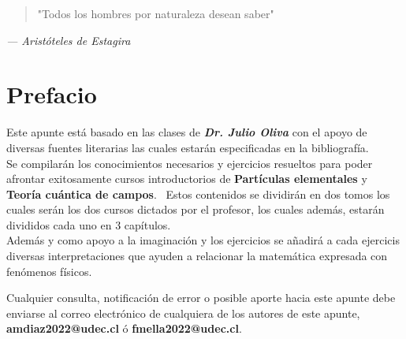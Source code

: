 \documentclass[../main.tex]{subfiles}
\begin{document}
\thispagestyle{empty}

\vspace*{\fill}  %
\begin{center}
    \begin{quote}
        "Todos los hombres por naturaleza desean saber"
    \end{quote}
    \vspace{1cm}  %
    \textit{— Aristóteles de Estagira}  %
\end{center}

\vspace*{\fill}  %
\newpage

\chapter*{Prefacio}

Este apunte está basado en las clases de \textbf{\emph{Dr. Julio Oliva}} con el apoyo de diversas fuentes literarias las cuales estarán especificadas en la bibliografía. \\
Se compilarán los conocimientos necesarios y ejercicios resueltos para poder afrontar exitosamente cursos introductorios de \textbf{Partículas elementales} y \textbf{Teoría cuántica de campos}.  \
Estos contenidos se dividirán en dos tomos los cuales serán los dos cursos dictados por el profesor, los cuales además, estarán divididos cada uno en 3 capítulos. \\
Además y como apoyo a la imaginación y los ejercicios se añadirá a cada ejercicis diversas interpretaciones que ayuden a relacionar la matemática expresada con fenómenos físicos.

\medskip

Cualquier consulta, notificación de error o posible aporte hacia este apunte debe enviarse al correo electrónico de cualquiera de los autores de este apunte, \textbf{amdiaz2022@udec.cl} ó \textbf{fmella2022@udec.cl}.
\end{document}
